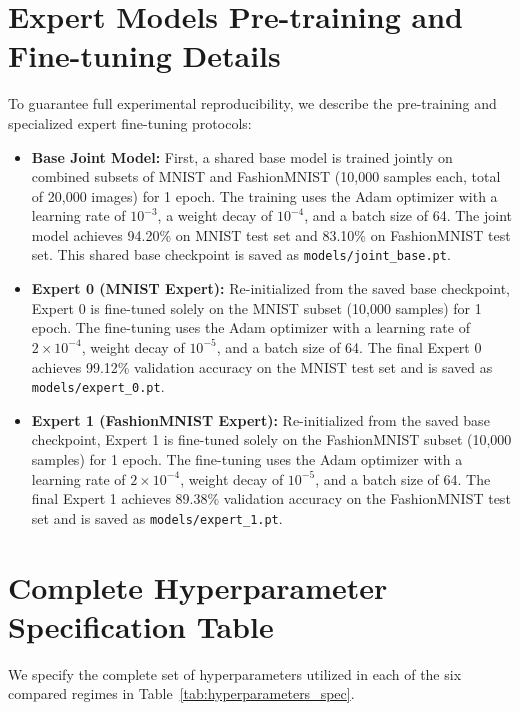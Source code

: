 \documentclass{article}
\theoremstyle{plain}
\theoremstyle{definition}
\theoremstyle{remark}
\begin{document}
\section{Expert Models Pre-training and Fine-tuning Details}
To guarantee full experimental reproducibility, we describe the pre-training and specialized expert fine-tuning protocols:
\begin{itemize}
    \item \textbf{Base Joint Model:} First, a shared base model is trained jointly on combined subsets of MNIST and FashionMNIST (10,000 samples each, total of 20,000 images) for 1 epoch. The training uses the Adam optimizer with a learning rate of $10^{-3}$, a weight decay of $10^{-4}$, and a batch size of 64. The joint model achieves 94.20\% on MNIST test set and 83.10\% on FashionMNIST test set. This shared base checkpoint is saved as \texttt{models/joint\_base.pt}.
    \item \textbf{Expert 0 (MNIST Expert):} Re-initialized from the saved base checkpoint, Expert 0 is fine-tuned solely on the MNIST subset (10,000 samples) for 1 epoch. The fine-tuning uses the Adam optimizer with a learning rate of $2 \times 10^{-4}$, weight decay of $10^{-5}$, and a batch size of 64. The final Expert 0 achieves 99.12\% validation accuracy on the MNIST test set and is saved as \texttt{models/expert\_0.pt}.
    \item \textbf{Expert 1 (FashionMNIST Expert):} Re-initialized from the saved base checkpoint, Expert 1 is fine-tuned solely on the FashionMNIST subset (10,000 samples) for 1 epoch. The fine-tuning uses the Adam optimizer with a learning rate of $2 \times 10^{-4}$, weight decay of $10^{-5}$, and a batch size of 64. The final Expert 1 achieves 89.38\% validation accuracy on the FashionMNIST test set and is saved as \texttt{models/expert\_1.pt}.
\end{itemize}

\section{Complete Hyperparameter Specification Table}
We specify the complete set of hyperparameters utilized in each of the six compared regimes in Table~\ref{tab:hyperparameters_spec}.
\end{document}
